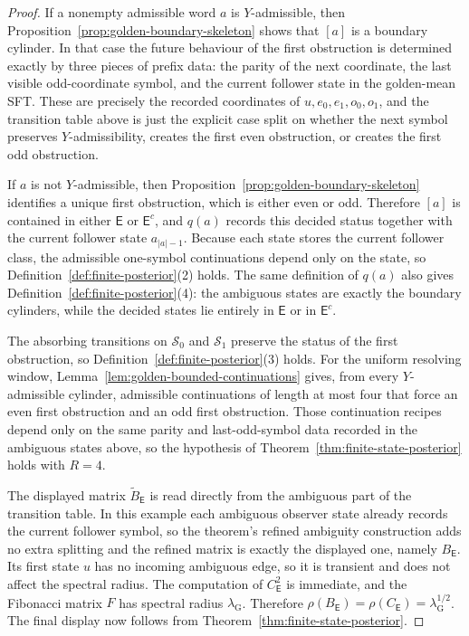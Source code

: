 \documentclass{etds}%
\numberwithin{equation}{section}
\theoremstyle{plain}
\theoremstyle{definition}
\theoremstyle{remark}
\begin{document}
\begin{proof}
If a nonempty admissible word $a$ is $Y$-admissible, then
Proposition~\ref{prop:golden-boundary-skeleton} shows that $[a]$ is a boundary
cylinder.  In that case the future behaviour of the first obstruction is
determined exactly by three pieces of prefix data: the parity of the next
coordinate, the last visible odd-coordinate symbol, and the current follower
state in the golden-mean SFT.  These are precisely the recorded coordinates of
$u,e_0,e_1,o_0,o_1$, and the transition table above is just the explicit case
split on whether the next symbol preserves $Y$-admissibility, creates the
first even obstruction, or creates the first odd obstruction.

If $a$ is not $Y$-admissible, then
Proposition~\ref{prop:golden-boundary-skeleton} identifies a unique first
obstruction, which is either even or odd.  Therefore $[a]$ is contained in
either $\mathsf{E}$ or $\mathsf{E}^c$, and $q(a)$ records this decided status
together with the current follower state $a_{|a|-1}$.  Because each state
stores the current follower class, the admissible one-symbol continuations
depend only on the state, so Definition~\ref{def:finite-posterior}(2) holds.
The same definition of $q(a)$ also gives
Definition~\ref{def:finite-posterior}(4): the ambiguous states are exactly the
boundary cylinders, while the decided states lie entirely in $\mathsf{E}$ or
in $\mathsf{E}^c$.

The absorbing transitions on $\mathcal{S}_0$ and $\mathcal{S}_1$ preserve the status of the first
obstruction, so Definition~\ref{def:finite-posterior}(3) holds.  For the
uniform resolving window, Lemma~\ref{lem:golden-bounded-continuations} gives,
from every $Y$-admissible cylinder, admissible continuations of length at most
four that force an even first obstruction and an odd first obstruction.  Those
continuation recipes depend only on the same parity and last-odd-symbol data
recorded in the ambiguous states above, so the hypothesis of
Theorem~\ref{thm:finite-state-posterior} holds with $R=4$.

The displayed matrix $\widetilde{B}_{\mathsf{E}}$ is read directly from the
ambiguous part of the transition table.  In this example each ambiguous
observer state already records the current follower symbol, so the theorem's
refined ambiguity construction adds no extra splitting and the refined matrix
is exactly the displayed one, namely $B_{\mathsf{E}}$.  Its first state $u$
has no incoming ambiguous edge, so it is transient and does not affect the
spectral radius.  The
computation of $C_{\mathsf{E}}^2$ is immediate, and the Fibonacci matrix $F$
has spectral radius $\lambda_{\mathrm G}$.  Therefore
$\rho(B_{\mathsf{E}})=\rho(C_{\mathsf{E}})=\lambda_{\mathrm G}^{1/2}$.  The
final display now follows from Theorem~\ref{thm:finite-state-posterior}.
\end{proof}
\end{document}
